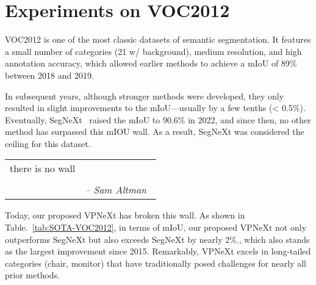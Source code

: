 \section{Experiments on VOC2012}
VOC2012 is one of the most classic datasets of semantic segmentation. 
%
It features a small number of categories (21 w/ background), medium resolution, and high annotation accuracy, which allowed earlier methods to achieve a mIoU of 89\% between 2018 and 2019. 

In subsequent years, although stronger methods were developed, they only resulted in slight improvements to the mIoU—usually by a few tenths (\ie < 0.5\%). 
%
Eventually, SegNeXt~\cite{cSegNeXt} raised the mIoU to 90.6\% in 2022, and since then, no other method has surpassed this mIOU wall. 
%
As a result, SegNeXt was considered the ceiling for this dataset.


\begin{table}[h]
    \normalsize
    \centering
    \begin{tabular}{cr}
        \midrule
          \quad there is no wall \quad\\
          \quad \\
         &\textit{\quad\quad-- Sam Altman~\cite{cNoWall}}\\
         \midrule
    \end{tabular}
\end{table}


Today, our proposed VPNeXt has broken this wall. 
%
%
As shown in Table.~\ref{tab:SOTA-VOC2012},
in terms of mIoU, our proposed VPNeXt not only outperforms SegNeXt but also exceeds SegNeXt by nearly 2\%., which also stands as the largest improvement since 2015.
%
Remarkably, VPNeXt excels in long-tailed categories (\eg chair, monitor) that have traditionally posed challenges for nearly all prior methods.


